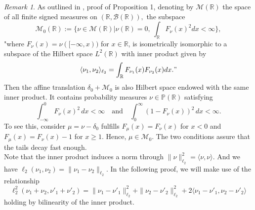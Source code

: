 \documentclass{article}
\newcommand{\cB}{\mathcal{B}}
\newcommand{\cM}{\mathcal{M}}
\newcommand{\cP}{\mathbb{P}}
\newcommand{\R}{\mathbb{R}}
\theoremstyle{plain}
\theoremstyle{definition}
\theoremstyle{remark}
\newtheorem{remark}[theorem]{Remark}
\begin{document}
\begin{remark}
    As outlined in \cite{rowland18}, proof of Proposition 1, denoting by $\cM(\R)$ the space of all finite signed measures on $(\R,\cB(\R)),$ the subspace 
    \[\cM_0(\R):=\{\nu\in\cM(\R)|\nu(\R)=0,\ \int_\R F_\nu (x)^2dx<\infty \},\]
    "where $F_\nu (x)=\nu([-\infty,x))$ for $x\in\R$, is isometrically isomorphic to a subspace of the Hilbert space $L^2(\R)$ with inner product given by 
    \[\langle\nu_1,\nu_2\rangle_{\ell_2}=\int_\R F_{\nu_1}(x)F_{\nu_2}(x)dx."\]
    Then the affine translation $\delta_0+\cM_0$ is also Hilbert space endowed with the same inner product. It contains probability measures $\nu\in\cP(\R)$ satisfying
    \[\int_{-\infty}^{0} F_{\nu}(x)^2 \, dx < \infty \quad \text{and} \quad \int_{0}^{\infty} (1 - F_{\nu}(x))^2 \, dx < \infty.\]
    To see this, consider $\mu= \nu - \delta_0$ fulfills $F_\mu(x)=F_\nu(x)$ for $x<0$ and $F_\mu(x)=F_\nu(x)-1$ for $x\geq 1$. Hence, $\mu\in\cM_0.$ The two conditions assure that the tails decay fast enough.\\
    Note that the inner product induces a norm through $\|\nu\|^2_{\ell_2}=\langle\nu,\nu\rangle.$ And we have $\ell_2(\nu_1,\nu_2)=\|\nu_1-\nu_2\|_{\ell_2}$. In the following proof, we will make use of the relationship
    \[\ell_2^2(\nu_1+\nu_2,\nu'_1+\nu'_2)=\|\nu_1-\nu'_1\|^2_{\ell_2}+\|\nu_2-\nu'_2\|^2_{\ell_2}+2\langle\nu_1-\nu'_1,\nu_2-\nu'_2\rangle\]
    holding by bilinearity of the inner product.
\end{remark}
\end{document}
